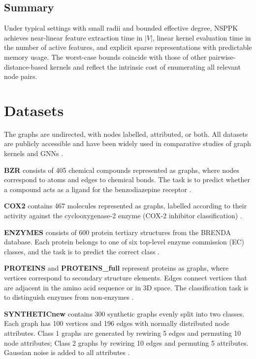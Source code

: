 \subsection{Summary}

Under typical settings with small radii and bounded effective degree, NSPPK achieves near-linear feature extraction time in $|V|$, linear kernel evaluation time in the number of active features, and explicit sparse representations with predictable memory usage.  
The worst-case bounds coincide with those of other pairwise-distance-based kernels and reflect the intrinsic cost of enumerating all relevant node pairs.


\section{Datasets}
\label{appendix:datasets}

The graphs are undirected, with nodes labelled, attributed, or both. All datasets are publicly accessible \cite{kersting2016benchmark,morris2020tudataset} and have been widely used in comparative studies of graph kernels and GNNs \cite{nikolentzos2021graph}.

\textbf{BZR} consists of 405 chemical compounds represented as graphs, where nodes correspond to atoms and edges to chemical bonds. The task is to predict whether a compound acts as a ligand for the benzodiazepine receptor \cite{Dobson2003DistinguishingES}.

\textbf{COX2} contains 467 molecules represented as graphs, labelled according to their activity against the cyclooxygenase-2 enzyme (COX-2 inhibitor classification) \cite{Dobson2003DistinguishingES}.

\textbf{ENZYMES} consists of 600 protein tertiary structures from the BRENDA database. Each protein belongs to one of six top-level enzyme commission (EC) classes, and the task is to predict the correct class \cite{borgwardt2005protein}.

\textbf{PROTEINS} and \textbf{PROTEINS\_full} represent proteins as graphs, where vertices correspond to secondary structure elements. Edges connect vertices that are adjacent in the amino acid sequence or in 3D space. The classification task is to distinguish enzymes from non-enzymes \cite{borgwardt2005protein}.

\textbf{SYNTHETICnew} contains 300 synthetic graphs evenly split into two classes. Each graph has 100 vertices and 196 edges with normally distributed node attributes. Class 1 graphs are generated by rewiring 5 edges and permuting 10 node attributes; Class 2 graphs by rewiring 10 edges and permuting 5 attributes. Gaussian noise is added to all attributes \cite{shervashidze2011weisfeiler}.



